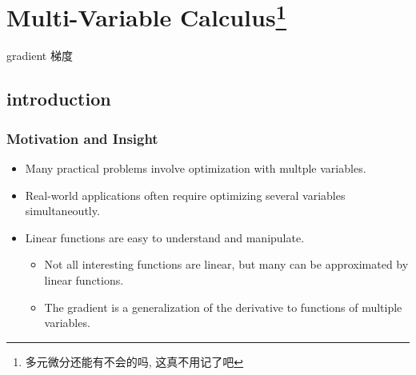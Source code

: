 \begin{comment}
    

\documentclass[lang=cn,10pt,green]{elegantbook} 
\title{2025年数理经济学笔记}
\subtitle{授课: 杨佳楠老师}

\author{徐靖}
\institute{PKU}
\date{Febuary 27, 2025}
\bioinfo{声明}{请勿用于个人学习外其他用途!}

\extrainfo{个人笔记, 如有谬误, 欢迎指正! 联系方式 : 2200012917@stu.pku.edu.cn}

\setcounter{tocdepth}{3}

\logo{logo-blue.png}
\cover{cover.jpg}

\usepackage{array}
\newcommand{\ccr}[1]{\makecell{{\color{#1}\rule{1cm}{1cm}}}}




\maketitle
\frontmatter

\tableofcontents

\mainmatter
\end{comment}

\chapter{Multi-Variable Calculus\footnote{多元微分还能有不会的吗, 这真不用记了吧}}

\begin{introduction}[Keywords]
    \item gradient 梯度
\end{introduction}
\section{introduction}
\subsection{Motivation and Insight}
\begin{itemize}
    \item Many practical problems involve optimization with multple variables.
    \item Real-world applications often require optimizing several variables simultaneoutly.
    \item Linear functions are easy to understand and manipulate.
    \begin{itemize}
        \item Not all interesting functions are linear, but many can be approximated by linear functions.
        \item The gradient is a generalization of the derivative to functions of multiple variables.
    \end{itemize}
\end{itemize}



%







